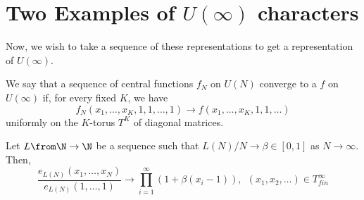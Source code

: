 \documentclass[11pt,leqno,oneside]{amsart}
\numberwithin{thm}{section}
\newcommand{\T}{T} %
\begin{document}
\section{Two Examples of \(U(\infty)\) characters}
Now, we
wish to take a sequence of these representations to get a
representation of \(U(\infty)\).
\begin{defn}
  We say that a sequence of central functions \(f_N\) on \(U(N)\)
  converge to a  \(f\) on \(U(\infty)\) if, for
  every fixed \(K\), we have \[
    f_N(x_1, \ldots, x_K,1,1, \ldots, 1) \to f(x_1, \ldots, x_K, 1, 1,
    \ldots)
  \]
  uniformly on the \(K\)-torus \(\T^K\) of diagonal matrices. 
\end{defn}
\begin{prop}
  Let \(L \from \N \to \N\) be a sequence such that \(L(N)/N \to \beta
  \in [0,1]\) as \(N \to \infty\). Then, \[
    \frac{e_{L(N)}(x_1, \ldots, x_N)}{e_{L(N)}(1,\ldots,1)} \to
    \prod_{i=1}^\infty (1+\beta(x_i-1)), \ \ (x_1, x_2, \ldots) \in \T^\infty_{fin}
  \]
\end{prop}
\end{document}
